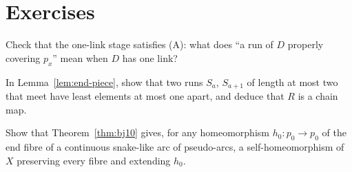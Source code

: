
\section*{Exercises}

\begin{exercise}
Check that the one-link stage satisfies (A): what does ``a run of $D$ properly covering $p_x$'' mean when $D$ has one link?
\end{exercise}

\begin{exercise}
In Lemma~\ref{lem:end-piece}, show that two runs $S_a$, $S_{a+1}$ of length at most two that meet have least elements at most one apart, and deduce that $R$ is a chain map.
\end{exercise}

\begin{exercise}
Show that Theorem~\ref{thm:bj10} gives, for any homeomorphism $h_0\colon p_0\to p_0$ of the end fibre of a continuous snake-like arc of pseudo-arcs, a self-homeomorphism of $X$
preserving every fibre and extending $h_0$.
\end{exercise}
